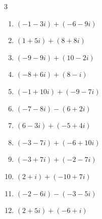 \begin{multicols}{3}
\begin{enumerate}
        \phantom{$\displaystyle =13-12i$}

\columnbreak %

\resetques

  \item $\displaystyle (-1-3i) + (-6-9i)$

        \phantom{$\displaystyle =-7-12i$}

  \item $\displaystyle (1+5i) + (8+8i)$

        \phantom{$\displaystyle =9+13i$}

  \item $\displaystyle (-9-9i) + (10-2i)$

        \phantom{$\displaystyle =1-11i$}

  \item $\displaystyle (-8+6i) + (8-i)$

        \phantom{$\displaystyle =5i$}

  \item $\displaystyle (-1+10i) + (-9-7i)$

        \phantom{$\displaystyle =-10+3i$}

  \item $\displaystyle (-7-8i) - (6+2i)$

        \phantom{$\displaystyle =-13-10i$}

  \item $\displaystyle (6-3i) + (-5+4i)$

        \phantom{$\displaystyle =1+i$}

  \item $\displaystyle (-3-7i) + (-6+10i)$

        \phantom{$\displaystyle =-9+3i$}

  \item $\displaystyle (-3+7i) + (-2-7i)$

        \phantom{$\displaystyle =-5$}

  \item $\displaystyle (2+i) + (-10+7i)$

        \phantom{$\displaystyle =-8+8i$}

  \item $\displaystyle (-2-6i) - (-3-5i)$

        \phantom{$\displaystyle =1-i$}

  \item $\displaystyle (2+5i) + (-6+i)$

        \phantom{$\displaystyle =-4+6i$}


\end{enumerate}
\end{multicols}
